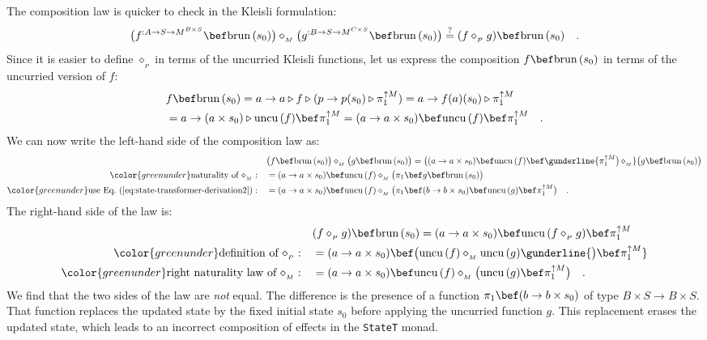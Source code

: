 The composition law is quicker to check in the Kleisli formulation:
\[
\big(f^{:A\rightarrow S\rightarrow M^{B\times S}}\bef\text{brun}\,(s_{0})\big)\diamond_{_{M}}\big(g^{:B\rightarrow S\rightarrow M^{C\times S}}\bef\text{brun}\,(s_{0})\big)\overset{?}{=}(f\diamond_{_{P}}g)\bef\text{brun}\,(s_{0})\quad.
\]
Since it is easier to define $\diamond_{_{P}}$ in terms of the uncurried
Kleisli functions, let us express the composition $f\bef\text{brun}\,(s_{0})$
in terms of the uncurried version of $f$:
\begin{align}
 & f\bef\text{brun}\,(s_{0})=a\rightarrow a\triangleright f\triangleright(p\rightarrow p(s_{0})\triangleright\pi_{1}^{\uparrow M})=a\rightarrow f(a)(s_{0})\triangleright\pi_{1}^{\uparrow M}\nonumber \\
 & =a\rightarrow(a\times s_{0})\triangleright\text{uncu}\,(f)\bef\pi_{1}^{\uparrow M}=(a\rightarrow a\times s_{0})\bef\text{uncu}\,(f)\bef\pi_{1}^{\uparrow M}\quad.\label{eq:state-transformer-derivation2}
\end{align}
We can now write the left-hand side of the composition law as:
\begin{align*}
 & \big(f\bef\text{brun}\,(s_{0})\big)\diamond_{_{M}}\big(g\bef\text{brun}\,(s_{0})\big)=\big((a\rightarrow a\times s_{0})\bef\text{uncu}\,(f)\bef\gunderline{\pi_{1}^{\uparrow M}\big)\,\diamond_{_{M}}}\big(g\bef\text{brun}\,(s_{0})\big)\\
{\color{greenunder}\text{naturality of }\diamond_{_{M}}:}\quad & =(a\rightarrow a\times s_{0})\bef\text{uncu}\,(f)\diamond_{_{M}}\big(\pi_{1}\bef g\bef\text{brun}\,(s_{0})\big)\\
{\color{greenunder}\text{use Eq.~(\ref{eq:state-transformer-derivation2})}:}\quad & =(a\rightarrow a\times s_{0})\bef\text{uncu}\,(f)\diamond_{_{M}}\big(\pi_{1}\bef(b\rightarrow b\times s_{0})\bef\text{uncu}\,(g)\bef\pi_{1}^{\uparrow M}\big)\quad.
\end{align*}
The right-hand side of the law is:
\begin{align*}
 & (f\diamond_{_{P}}g)\bef\text{brun}\,(s_{0})=(a\rightarrow a\times s_{0})\bef\text{uncu}\,(f\diamond_{_{P}}g)\bef\pi_{1}^{\uparrow M}\\
{\color{greenunder}\text{definition of }\diamond_{_{P}}:}\quad & =(a\rightarrow a\times s_{0})\bef\big(\text{uncu}\,(f)\diamond_{_{M}}\text{uncu}\,(g)\gunderline{\big)\bef\pi_{1}^{\uparrow M}}\\
{\color{greenunder}\text{right naturality law of }\diamond_{_{M}}:}\quad & =(a\rightarrow a\times s_{0})\bef\text{uncu}\,(f)\diamond_{_{M}}\big(\text{uncu}\,(g)\bef\pi_{1}^{\uparrow M}\big)\quad.
\end{align*}
We find that the two sides of the law are \emph{not} equal. The difference
is the presence of a function $\pi_{1}\bef(b\rightarrow b\times s_{0})$
of type $B\times S\rightarrow B\times S$. That function replaces
the updated state by the fixed initial state $s_{0}$ before applying
the uncurried function $g$. This replacement erases the updated state,
which leads to an incorrect composition of effects in the \lstinline!StateT!
monad.

